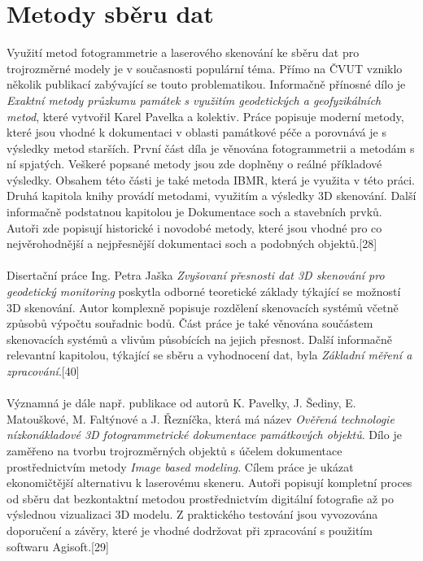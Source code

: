 \documentclass[a4paper, 12pt]{report}
\begin{document}
\section{Metody sběru dat}
Využití metod fotogrammetrie a laserového skenování ke sběru dat pro trojrozměrné modely je v současnosti populární téma. Přímo na ČVUT vzniklo několik publikací zabývající se touto problematikou. Informačně přínosné dílo je \textit{Exaktní metody průzkumu památek s využitím geodetických a geofyzikálních metod}, které vytvořil Karel Pavelka a kolektiv. Práce popisuje moderní metody, které jsou vhodné k dokumentaci v oblasti památkové péče a porovnává je s výsledky metod starších. První část díla je věnována fotogrammetrii a metodám s ní spjatých. Veškeré popsané metody jsou zde doplněny o reálné příkladové výsledky. Obsahem této části je také metoda IBMR, která je využita v této práci. Druhá kapitola knihy provádí metodami, využitím a výsledky 3D skenování. Další informačně podstatnou kapitolou je Dokumentace soch a stavebních prvků. Autoři zde popisují historické i novodobé metody, které jsou vhodné pro co nejvěrohodnější a nejpřesnější dokumentaci soch a podobných objektů.[28]\\
\\
Disertační práce Ing. Petra Jaška \textit{Zvyšovaní přesnosti dat 3D skenování pro geodetický monitoring} poskytla odborné teoretické základy týkající se možností 3D skenování. Autor komplexně popisuje rozdělení skenovacích systémů včetně způsobů výpočtu souřadnic bodů. Část práce je také věnována součástem skenovacích systémů a vlivům působících na jejich přesnost. Další informačně relevantní kapitolou, týkající se sběru a vyhodnocení dat, byla \textit{Základní měření a zpracování}.[40]\\
\\
Významná je dále např. publikace od autorů K. Pavelky, J. Šediny, E. Matouškové, M. Faltýnové a J. Řezníčka, která má název \textit{Ověřená technologie nízkonákladové 3D fotogrammetrické dokumentace památkových objektů}. Dílo je zaměřeno na tvorbu trojrozměrných objektů s účelem dokumentace prostřednictvím metody \textit{Image based modeling}. Cílem práce je ukázat ekonomičtější alternativu k laserovému skeneru. Autoři popisují kompletní proces od sběru dat bezkontaktní metodou prostřednictvím digitální fotografie až po výslednou vizualizaci 3D modelu. Z praktického testování jsou vyvozována doporučení a závěry, které je vhodné dodržovat při zpracování s použitím softwaru Agisoft.[29]\\
\\
\end{document}
